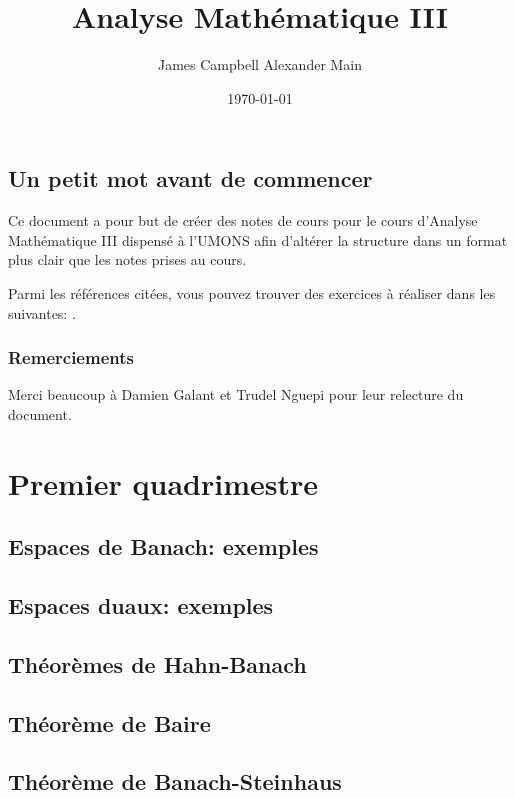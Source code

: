 \documentclass[a4paper, 12pt]{book}
\title{Analyse Mathématique III}
\author{James Campbell Alexander Main}
\date{\today}
\theoremstyle{definition} \newtheorem{df}{D\'{e}finition}[chapter]
\theoremstyle{definition} \newtheorem{ex}[df]{Exemple}
\theoremstyle{definition} \newtheorem{thm}[df]{Th\'{e}or\`{e}me}
\theoremstyle{definition} \newtheorem{cor}[df]{Corollaire}
\theoremstyle{definition} \newtheorem{lem}[df]{Lemme}
\theoremstyle{definition} \newtheorem{prop}[df]{Proposition}
\theoremstyle{definition} \newtheorem{rem}[df]{Remarque}
\theoremstyle{definition} \newtheorem{exo}{Exercice}[chapter]
\begin{document}
\frontmatter

\maketitle

\tableofcontents
\chapter{Un petit mot avant de commencer}
Ce document a pour but de créer des notes de cours
pour le cours d'Analyse Mathématique III dispensé
à l'UMONS afin d'altérer la structure dans un format
plus clair que les notes prises au cours.

Parmi les références citées, vous pouvez trouver des exercices
à réaliser dans les suivantes: \cite{hb:exo1}.

\section*{Remerciements}

Merci beaucoup à Damien Galant et Trudel Nguepi pour leur relecture du document.

\mainmatter
\part{Premier quadrimestre}
\chapter{Espaces de Banach: exemples}


\chapter{Espaces duaux: exemples}


\chapter{Théorèmes de Hahn-Banach}


\chapter{Théorème de Baire}


\chapter{Théorème de Banach-Steinhaus}

\end{document}
